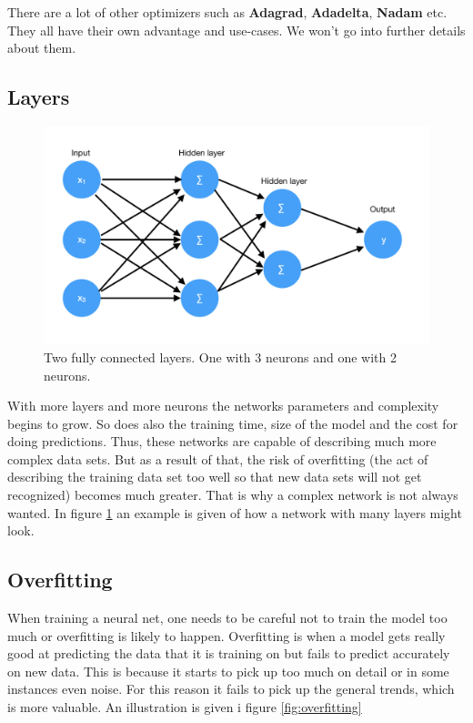 There are a lot of other optimizers such as \textbf{Adagrad}, \textbf{Adadelta}, \textbf{Nadam} etc. They all have their own advantage and use-cases. We won't go into further details about them.

\subsection{Layers}

\begin{figure}[hbtp]
\begin{center}
\includegraphics[width = 1.0\textwidth]{./Images/fully_connected.jpg} 
\caption{Two fully connected layers. One with 3 neurons and one with 2 neurons.}
\label{fig:layers}
\end{center}
\end{figure}

With more layers and more neurons the networks parameters and complexity begins to grow. So does also the training time, size of the model and the cost for doing predictions. 
Thus, these networks are capable of describing much more complex data sets. But as a result of that, the risk of overfitting (the act of describing the training data set too well so that new data sets will not get recognized) becomes much greater.
That is why a complex network is not always wanted.
In figure \ref{fig:layers} an example is given of how a network with many layers might look.

\subsection{Overfitting}
\label{overfitting}
When training a neural net, one needs to be careful not to train the model too much or overfitting is likely to happen.
Overfitting is when a model gets really good at predicting the data that it is training on but fails to predict accurately on new data.
This is because it starts to pick up too much on detail or in some instances even noise.
For this reason it fails to pick up the general trends, which is more valuable.
An illustration is given i figure \ref{fig:overfitting}

